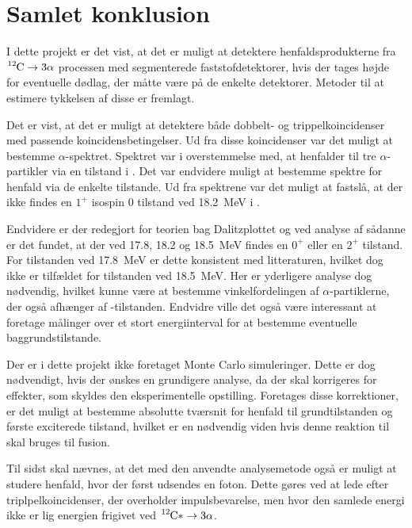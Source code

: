 \chapter{Samlet konklusion}
\label{cha:konklusion}

I dette projekt er det vist, at det er muligt at detektere henfaldsprodukterne fra $\Carb
\rightarrow 3\alpha$ processen med segmenterede faststofdetektorer, hvis der tages højde for
eventuelle dødlag, der måtte være på de enkelte detektorer. Metoder til at estimere tykkelsen af
disse er fremlagt.


Det er vist, at det er muligt at detektere både dobbelt- og trippelkoincidenser med passende
koincidensbetingelser. Ud fra disse koincidenser var det muligt at bestemme $\alpha$-spektret. Spektret
var i overstemmelse med, at \Carb henfalder til tre $\alpha$-partikler via en tilstand i \Be. Det var
endvidere muligt at bestemme spektre for henfald via de enkelte tilstande. Ud fra spektrene var det
muligt at fastslå, at der ikke findes en $1^{+}$ isospin 0 tilstand ved \SI{18.2}{\MeV} i \Carb.

Endvidere er der redegjort for teorien bag Dalitzplottet og ved analyse af sådanne er det fundet, at
der ved \num{17.8}, \num{18.2} og \SI{18.5}{\MeV} findes en $0^{+}$ eller en $2^{+}$ tilstand. For
tilstanden ved \SI{17.8}{\MeV} er dette konsistent med litteraturen, hvilket dog ikke er tilfældet
for tilstanden ved \SI{18.5}{\MeV}. Her er yderligere analyse dog nødvendig, hvilket kunne være at
bestemme vinkelfordelingen af $\alpha$-partiklerne, der også afhænger af \Carb-tilstanden. Endvidre ville
det også være interessant at foretage målinger over et stort energiinterval for at bestemme
eventuelle baggrundstilstande.

Der er i dette projekt ikke foretaget Monte Carlo simuleringer. Dette er dog nødvendigt, hvis der
ønskes en grundigere analyse, da der skal korrigeres for effekter, som skyldes den eksperimentelle
opstilling. Foretages disse korrektioner, er det muligt at bestemme absolutte tværsnit for henfald
til grundtilstanden og første exciterede tilstand, hvilket er en nødvendig viden hvis denne reaktion
til skal bruges til fusion.  

Til sidst skal nævnes, at det med den anvendte analysemetode også er muligt at studere henfald, hvor
der først udsendes en foton. Dette gøres ved at lede efter triplpelkoincidenser, der overholder
impulsbevarelse, men hvor den samlede energi ikke er lig energien frigivet ved $\Carb* \rightarrow 3\alpha$.







